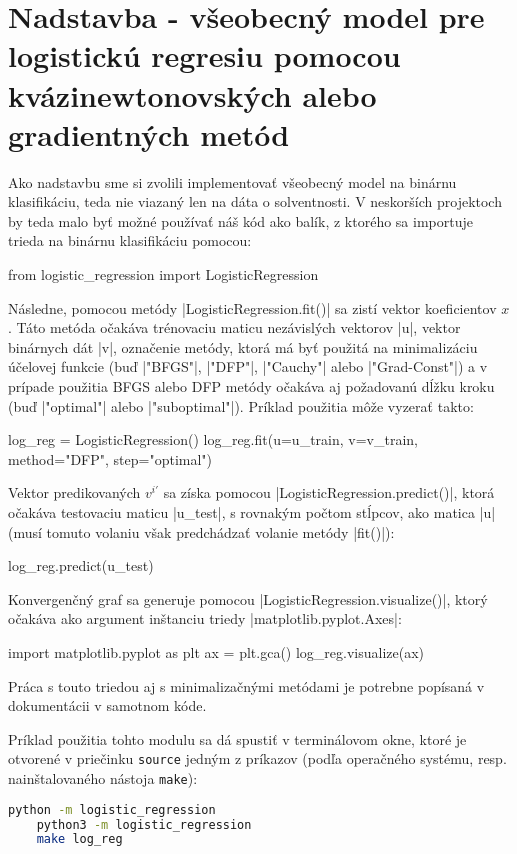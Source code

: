 \documentclass[report.tex]{subfiles}
\begin{document}
	
\section{Nadstavba - všeobecný model pre logistickú regresiu pomocou kvázinewtonovských alebo gradientných metód}\label{sec:H}

Ako nadstavbu sme si zvolili implementovať všeobecný model na binárnu klasifikáciu, teda nie viazaný len na dáta o solventnosti. V neskorších projektoch by teda malo byť možné používať náš kód ako balík, z ktorého sa importuje trieda na binárnu klasifikáciu pomocou:

\begin{python}
	from logistic_regression import LogisticRegression
\end{python}

Následne, pomocou metódy \pyth|LogisticRegression.fit()| sa zistí vektor koeficientov $x$. Táto metóda očakáva trénovaciu maticu nezávislých vektorov \pyth|u|, vektor binárnych dát \pyth|v|, označenie metódy, ktorá má byť použitá na minimalizáciu účelovej funkcie (buď \pyth|"BFGS"|, \pyth|"DFP"|, \pyth|"Cauchy"| alebo \pyth|"Grad-Const"|) a v prípade použitia BFGS alebo DFP metódy očakáva aj požadovanú dĺžku kroku (buď \pyth|"optimal"| alebo \pyth|"suboptimal"|). Príklad použitia môže vyzerať takto:

\begin{python}
	log_reg = LogisticRegression()
	log_reg.fit(u=u_train, v=v_train, method="DFP", step="optimal")
\end{python}

Vektor predikovaných $v^{i'}$ sa získa pomocou \pyth|LogisticRegression.predict()|, ktorá očakáva testovaciu maticu \pyth|u_test|, s rovnakým počtom stĺpcov, ako matica \pyth|u| (musí tomuto volaniu však predchádzať volanie metódy \pyth|fit()|):

\begin{python}
	log_reg.predict(u_test)
\end{python}

Konvergenčný graf sa generuje pomocou \pyth|LogisticRegression.visualize()|, ktorý očakáva ako argument inštanciu triedy \pyth|matplotlib.pyplot.Axes|:

\begin{python}
	import matplotlib.pyplot as plt
	ax = plt.gca()
	log_reg.visualize(ax)
\end{python}

Práca s touto triedou aj s minimalizačnými metódami je potrebne popísaná v dokumentácii v samotnom kóde.

Príklad použitia tohto modulu sa dá spustiť v terminálovom okne, ktoré je otvorené v priečinku \verb*|source| jedným z príkazov (podľa operačného systému, resp. nainštalovaného nástoja \verb*|make|):

\begin{lstlisting}[style=terminal, language=bash]
	python -m logistic_regression
	python3 -m logistic_regression
	make log_reg
\end{lstlisting}

	
\end{document}
